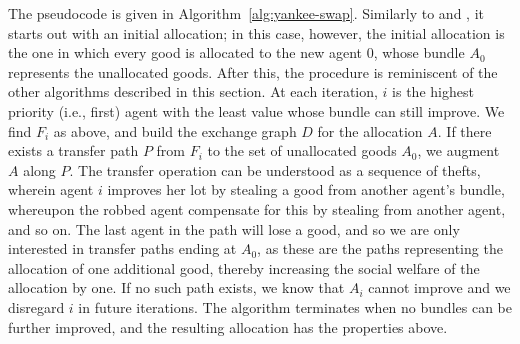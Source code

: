 The pseudocode is given in Algorithm~\ref{alg:yankee-swap}. Similarly to  and , it starts out with an initial allocation; in this case, however, the initial allocation is the one in which every good is allocated to the new agent $0$, whose bundle $A_0$ represents the unallocated goods. After this, the procedure is reminiscent of the other algorithms described in this section. At each iteration, $i$ is the highest priority (i.e., first) agent with the least value whose bundle can still improve. We find $F_i$ as above, and build the exchange graph $D$ for the allocation $A$. If there exists a transfer path $P$ from $F_i$ to the set of unallocated goods $A_0$, we augment $A$ along $P$. The transfer operation can be understood as a sequence of thefts, wherein agent $i$ improves her lot by stealing a good from another agent's bundle, whereupon the robbed agent compensate for this by stealing from another agent, and so on. The last agent in the path will lose a good, and so we are only interested in transfer paths ending at $A_0$, as these are the paths representing the allocation of one additional good, thereby increasing the social welfare of the allocation by one. If no such path exists, we know that $A_i$ cannot improve and we disregard $i$ in future iterations. The algorithm terminates when no bundles can be further improved, and the resulting allocation has the properties above.

